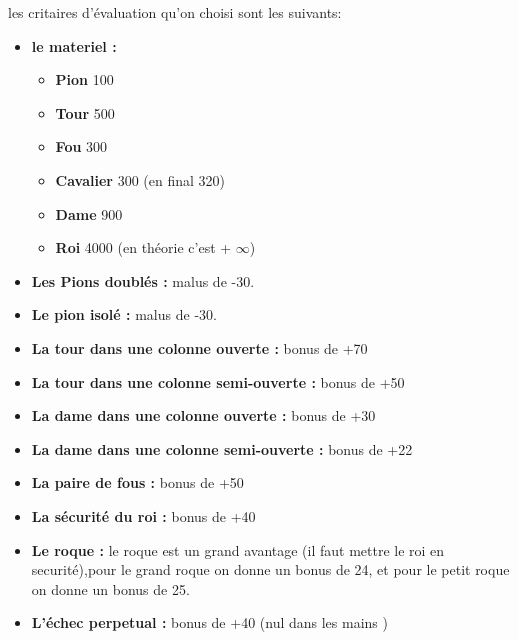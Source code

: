 \documentclass[12pt]{report}
\begin{document}
 les critaires d'évaluation qu'on choisi sont les suivants:
 \newpage
 \begin{itemize}
 	\item \textbf{le materiel :} 
 	\newline
 	\begin{itemize}
 		\item \textbf{ Pion }	 100 \\
 \item \textbf{	Tour }    500 \\
 \item \textbf{	Fou   }   300 \\
 \item \textbf{	Cavalier} 300 (en final 320) \\
 \item \textbf{	Dame	 }900 \\
 \item \textbf{	Roi		 }4000 (en théorie c'est + $\infty$) \\
 \end{itemize} 
	\item \textbf{Les Pions doublés :} malus de -30.\\
	\item \textbf{Le pion isolé :}     malus de -30.\\
	\item \textbf{La tour dans une colonne ouverte :} bonus de +70\\
	\item \textbf{La tour dans une colonne semi-ouverte :} bonus de +50\\	
	\item \textbf{La dame dans une colonne ouverte :} bonus de +30\\
	\item \textbf{La dame dans une colonne semi-ouverte :} bonus de +22\\	
	\item \textbf{La paire de fous :} bonus de +50\\	
	\item \textbf{La sécurité du roi :} bonus de +40\\	
	\item \textbf{Le roque :} le roque est un grand avantage (il faut mettre le roi en securité),pour le grand roque on donne un bonus de 24, et pour le petit roque on donne un bonus de 25. \\	
	\item \textbf{L'échec perpetual :} bonus de +40 (nul dans les mains )\\

\end{itemize}
\end{document}
